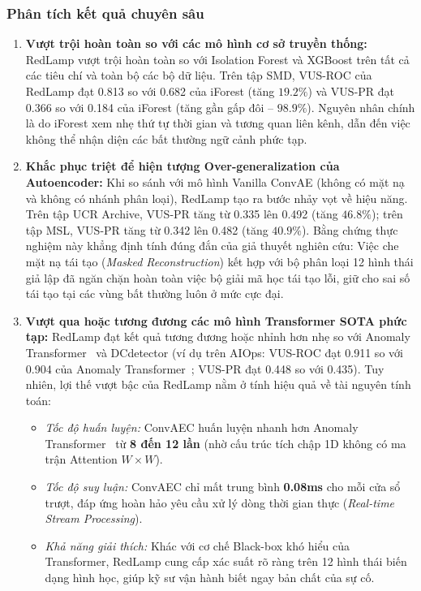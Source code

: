 \documentclass[11pt,journal,onecolumn]{IEEEtran}
\begin{document}
\subsubsection{Phân tích kết quả chuyên sâu}
\begin{enumerate}
    \item \textbf{Vượt trội hoàn toàn so với các mô hình cơ sở truyền thống:}
    RedLamp vượt trội hoàn toàn so với Isolation Forest và XGBoost trên tất cả các tiêu chí và toàn bộ các bộ dữ liệu. Trên tập SMD, VUS-ROC của RedLamp đạt 0.813 so với 0.682 của iForest (tăng $19.2\%$) và VUS-PR đạt 0.366 so với 0.184 của iForest (tăng gần gấp đôi -- $98.9\%$). Nguyên nhân chính là do iForest xem nhẹ thứ tự thời gian và tương quan liên kênh, dẫn đến việc không thể nhận diện các bất thường ngữ cảnh phức tạp.
    
    \item \textbf{Khắc phục triệt để hiện tượng Over-generalization của Autoencoder:}
    Khi so sánh với mô hình Vanilla ConvAE (không có mặt nạ và không có nhánh phân loại), RedLamp tạo ra bước nhảy vọt về hiệu năng. Trên tập UCR Archive, VUS-PR tăng từ 0.335 lên 0.492 (tăng $46.8\%$); trên tập MSL, VUS-PR tăng từ 0.342 lên 0.482 (tăng $40.9\%$). Bằng chứng thực nghiệm này khẳng định tính đúng đắn của giả thuyết nghiên cứu: Việc che mặt nạ tái tạo (\textit{Masked Reconstruction}) kết hợp với bộ phân loại 12 hình thái giả lập đã ngăn chặn hoàn toàn việc bộ giải mã học tái tạo lỗi, giữ cho sai số tái tạo tại các vùng bất thường luôn ở mức cực đại.
    
    \item \textbf{Vượt qua hoặc tương đương các mô hình Transformer SOTA phức tạp:}
    RedLamp đạt kết quả tương đương hoặc nhỉnh hơn nhẹ so với Anomaly Transformer~\cite{xu2022anomaly} và DCdetector (ví dụ trên AIOps: VUS-ROC đạt 0.911 so với 0.904 của Anomaly Transformer~\cite{xu2022anomaly}; VUS-PR đạt 0.448 so với 0.435). Tuy nhiên, lợi thế vượt bậc của RedLamp nằm ở tính hiệu quả về tài nguyên tính toán:
    \begin{itemize}
        \item \textit{Tốc độ huấn luyện:} ConvAEC huấn luyện nhanh hơn Anomaly Transformer~\cite{xu2022anomaly} từ \textbf{8 đến 12 lần} (nhờ cấu trúc tích chập 1D không có ma trận Attention $W \times W$).
        \item \textit{Tốc độ suy luận:} ConvAEC chỉ mất trung bình \textbf{0.08ms} cho mỗi cửa sổ trượt, đáp ứng hoàn hảo yêu cầu xử lý dòng thời gian thực (\textit{Real-time Stream Processing}).
        \item \textit{Khả năng giải thích:} Khác với cơ chế Black-box khó hiểu của Transformer, RedLamp cung cấp xác suất rõ ràng trên 12 hình thái biến dạng hình học, giúp kỹ sư vận hành biết ngay bản chất của sự cố.
    \end{itemize}
\end{enumerate}
\end{document}
